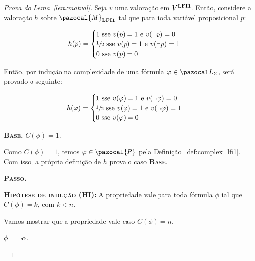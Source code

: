     \begin{proof}[Prova do Lema~\ref{lem:matval}]
        Seja $v$ uma valoração em $V^{{\normalfont\textbf{LFI1}}}$. Então, considere a valoração $h$ sobre $\pazocal{M}_{\lfium}$ tal que para toda variável proposicional $p$:
        \begin{center}
            \begin{equation*}
                h(p) =
                \begin{cases}
                  1 \text{ sse } v(p) = 1 \text{ e } v(\neg p) = 0 \\
                  \sfrac{1}{2}{} \text{ sse } v(p) = 1 \text{ e } v(\neg p) = 1 \\
                  0 \text{ sse } v(p) = 0
                \end{cases}
              \end{equation*}
        \end{center}

        Então, por indução na complexidade de uma fórmula $\phi \in \ling{}$, será provado o seguinte:
        \begin{center}
            \begin{equation*}
                h(\varphi) =
                \begin{cases}
                  1 \text{ sse } v(\varphi) = 1 \text{ e } v(\neg \varphi) = 0 \\
                  \sfrac{1}{2}{} \text{ sse } v(\varphi) = 1 \text{ e } v(\neg \varphi) = 1 \\
                  0 \text{ sse } v(\varphi) = 0
                \end{cases}
              \end{equation*}
        \end{center}

        \noindent \textbf{\textsc{Base.}} $C(\phi) = 1$.

        Como $C(\phi) = 1$, temos $\phi \in \pazocal{P}$ pela Definição~\ref{def:complex_lfi1}. Com isso, a própria definição de $h$ prova o caso \textbf{\textsc{Base}}.

        
        \noindent \textbf{\textsc{Passo.}} 

        \noindent \textbf{\textsc{Hipótese de indução (HI):}} A propriedade vale para toda fórmula $\phi$ tal que $C(\phi) = k$, com $k < n$.

        Vamos mostrar que a propriedade vale caso $C(\phi) = n$.

        \begin{provaporcasos}
            \casodeprova{} $\phi = \neg \alpha$.
                

\end{provaporcasos}
\end{proof}
